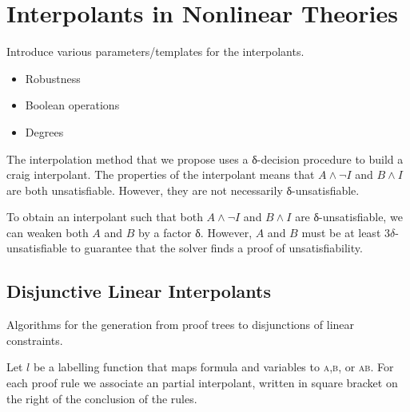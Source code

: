 \section{Interpolants in Nonlinear Theories}
\label{sec:itp}

Introduce various parameters/templates for the interpolants. 
\begin{itemize}
	\item Robustness
	\item Boolean operations
	\item Degrees 
\end{itemize}

\begin{remark}[δ-interpolants]
The interpolation method that we propose uses a δ-decision procedure to build a craig interpolant.
The properties of the interpolant means that $A ∧ ¬I$ and $B ∧ I$ are both unsatisfiable.
However, they are not necessarily δ-unsatisfiable.

To obtain an interpolant such that both $A ∧ ¬I$ and $B ∧ I$ are δ-unsatisfiable, we can weaken both $A$ and $B$ by a factor δ.
However, $A$ and $B$ must be at least $3δ$-unsatisfiable to guarantee that the solver finds a proof of unsatisfiability.
\end{remark}


\subsection{Disjunctive Linear Interpolants}

Algorithms for the generation from proof trees to disjunctions of linear constraints. 

Let $l$ be a labelling function that maps formula and variables to \textsc{a},\textsc{b}, or \textsc{ab}.
For each proof rule we associate an partial interpolant, written in square bracket on the right of the conclusion of the rules.



